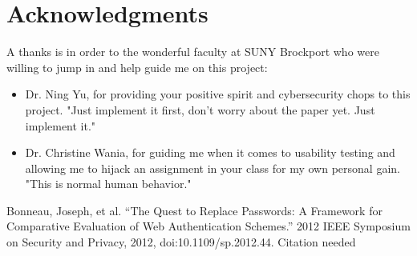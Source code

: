 \documentclass[conference]{IEEEtran}
\begin{document}
\section*{Acknowledgments}
A thanks is in order to the wonderful faculty at SUNY Brockport who were willing to jump in and help guide me on this project:
\begin{itemize}
	\item Dr. Ning Yu, for providing your positive spirit and cybersecurity chops to this project. "Just implement it first, don't worry about the paper yet. Just implement it."
	\item Dr. Christine Wania, for guiding me when it comes to usability testing and allowing me to hijack an assignment in your class for my own personal gain. "This is normal human behavior."
\end{itemize}

\begin{thebibliography}{00}
 Bonneau, Joseph, et al. “The Quest to Replace Passwords: A Framework for Comparative Evaluation of Web Authentication Schemes.” 2012 IEEE Symposium on Security and Privacy, 2012, doi:10.1109/sp.2012.44.
 Citation needed
\end{thebibliography}
\end{document}
